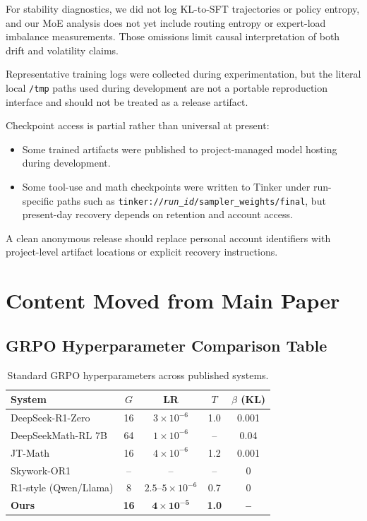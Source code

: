 \documentclass{article}
\begin{document}
For stability diagnostics, we did not log KL-to-SFT trajectories or policy entropy, and our MoE analysis does not yet include routing entropy or expert-load imbalance measurements. Those omissions limit causal interpretation of both drift and volatility claims.

Representative training logs were collected during experimentation, but the literal local \texttt{/tmp} paths used during development are not a portable reproduction interface and should not be treated as a release artifact.

Checkpoint access is partial rather than universal at present:
\begin{itemize}
    \item Some trained artifacts were published to project-managed model hosting during development.
    \item Some tool-use and math checkpoints were written to Tinker under run-specific paths such as \texttt{tinker://\textit{run\_id}/sampler\_weights/final}, but present-day recovery depends on retention and account access.
\end{itemize}
A clean anonymous release should replace personal account identifiers with project-level artifact locations or explicit recovery instructions.

\section{Content Moved from Main Paper}

\subsection{GRPO Hyperparameter Comparison Table}

\begin{table}[htbp]
    \centering
    \footnotesize
    \caption{Standard GRPO hyperparameters across published systems.}
    \begin{tabular}{lcccc}
        \toprule
        System & $G$ & LR & $T$ & $\beta$ (KL) \\
        \midrule
        DeepSeek-R1-Zero & 16 & $3 \times 10^{-6}$ & 1.0 & 0.001 \\
        DeepSeekMath-RL 7B & 64 & $1 \times 10^{-6}$ & -- & 0.04 \\
        JT-Math & 16 & $4 \times 10^{-6}$ & 1.2 & 0.001 \\
        Skywork-OR1 & -- & -- & -- & 0 \\
        R1-style (Qwen/Llama) & 8 & $2.5$--$5 \times 10^{-6}$ & 0.7 & 0 \\
        \midrule
        \textbf{Ours} & \textbf{16} & $\mathbf{4 \times 10^{-5}}$ & \textbf{1.0} & \textbf{--} \\
        \bottomrule
    \end{tabular}
\end{table}
\end{document}
